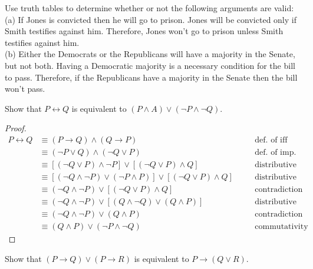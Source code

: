 \begin{tcolorbox}[title=Problem 5, breakable]
Use truth tables to determine whether or not the following arguments are valid: \\
(a) If Jones is convicted then he will go to prison. Jones will be convicted only if 
Smith testifies against him. Therefore, Jones won't go to prison unless Smith testifies
against him. \\
(b) Either the Democrats or the Republicans will have a majority in the Senate,
but not both. Having a Democratic majority is a necessary condition for the bill to
pass. Therefore, if the Republicans have a majority in the Senate then the bill
won't pass.
\end{tcolorbox}

\begin{tcolorbox}[title=Problem 6 (a), breakable]
Show that $P \leftrightarrow Q$ is equivalent to
$(P \wedge A) \vee (\neg P \wedge \neg Q)$.
\end{tcolorbox}

\begin{proof}
\begin{align*}
P \leftrightarrow Q &\equiv 
    (P \rightarrow Q) \wedge (Q \rightarrow P) && \quad \text{def. of iff} \\
&\equiv (\neg P \vee Q) \wedge (\neg Q \vee P) && \quad \text{def. of imp.} \\
&\equiv [(\neg Q \vee P) \wedge \neg P] \vee [(\neg Q \vee P) \wedge Q] && \quad \text{distributive} \\
&\equiv [(\neg Q \wedge \neg P) \vee (\neg P \wedge P)] \vee [(\neg Q \vee P) \wedge Q] && \quad \text{distributive} \\
&\equiv (\neg Q \wedge \neg P) \vee [(\neg Q \vee P) \wedge Q] && \quad \text{contradiction} \\
&\equiv (\neg Q \wedge \neg P) \vee [(Q \wedge \neg Q) \vee (Q \wedge P)] && \quad \text{distributive} \\
&\equiv (\neg Q \wedge \neg P) \vee (Q \wedge P) && \quad \text{contradiction} \\
&\equiv (Q \wedge P) \vee (\neg P \wedge \neg Q) && \quad \text{commutativity}
\end{align*}
\end{proof}

\begin{tcolorbox}[title=Problem 6 (b), breakable]
Show that $(P \rightarrow Q) \vee (P \rightarrow R)$ is equivalent to
$P \rightarrow (Q \vee R)$.
\end{tcolorbox}

